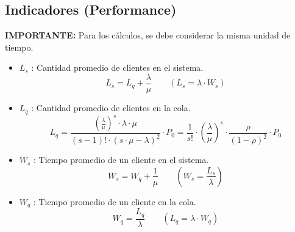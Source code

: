 \documentclass{templateNote}
\begin{document}
\newpage
\subsection{Indicadores (Performance)}
\textbf{IMPORTANTE:} Para los cálculos, se debe considerar la misma unidad de tiempo.
\begin{itemize}
    \item $L_s$ : Cantidad promedio de clientes en el sistema.
    \begin{equation*}
        L_s = L_q + \frac{\lambda}{\mu} \qquad (L_s = \lambda \cdot W_s)
    \end{equation*}

    \item $L_q$ : Cantidad promedio de clientes en la cola.
    \begin{equation*}
        L_q = \frac{\left(\frac{\lambda}{\mu}\right)^s \cdot \lambda \cdot \mu}{(s-1)! \cdot (s \cdot \mu - \lambda)^2} \cdot P_0 = \frac{1}{s!} \cdot \left(\frac{\lambda}{\mu}\right)^s \cdot \frac{\rho}{(1-\rho)^2} \cdot P_0
    \end{equation*}

    \item $W_s$ : Tiempo promedio de un cliente en el sistema.
    \begin{equation*}
        W_s = W_q + \frac{1}{\mu} \qquad (W_s = \frac{L_s}{\lambda})
    \end{equation*}

    \item $W_q$ : Tiempo promedio de un cliente en la cola.
    \begin{equation*}
        W_q = \frac{L_q}{\lambda} \qquad (L_q = \lambda \cdot W_q)
    \end{equation*}
\end{itemize}
\end{document}
